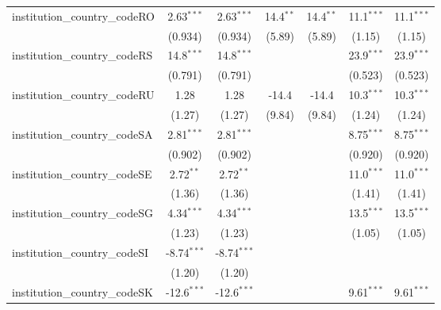 \begin{tabular}{lcccccc}
   institution\_country\_codeRO          & 2.63$^{***}$   & 2.63$^{***}$   & 14.4$^{**}$   & 14.4$^{**}$   & 11.1$^{***}$  & 11.1$^{***}$\\   
                                         & (0.934)        & (0.934)        & (5.89)        & (5.89)        & (1.15)        & (1.15)\\   
   institution\_country\_codeRS          & 14.8$^{***}$   & 14.8$^{***}$   &               &               & 23.9$^{***}$  & 23.9$^{***}$\\   
                                         & (0.791)        & (0.791)        &               &               & (0.523)       & (0.523)\\   
   institution\_country\_codeRU          & 1.28           & 1.28           & -14.4         & -14.4         & 10.3$^{***}$  & 10.3$^{***}$\\   
                                         & (1.27)         & (1.27)         & (9.84)        & (9.84)        & (1.24)        & (1.24)\\   
   institution\_country\_codeSA          & 2.81$^{***}$   & 2.81$^{***}$   &               &               & 8.75$^{***}$  & 8.75$^{***}$\\   
                                         & (0.902)        & (0.902)        &               &               & (0.920)       & (0.920)\\   
   institution\_country\_codeSE          & 2.72$^{**}$    & 2.72$^{**}$    &               &               & 11.0$^{***}$  & 11.0$^{***}$\\   
                                         & (1.36)         & (1.36)         &               &               & (1.41)        & (1.41)\\   
   institution\_country\_codeSG          & 4.34$^{***}$   & 4.34$^{***}$   &               &               & 13.5$^{***}$  & 13.5$^{***}$\\   
                                         & (1.23)         & (1.23)         &               &               & (1.05)        & (1.05)\\   
   institution\_country\_codeSI          & -8.74$^{***}$  & -8.74$^{***}$  &               &               &               &   \\   
                                         & (1.20)         & (1.20)         &               &               &               &   \\   
   institution\_country\_codeSK          & -12.6$^{***}$  & -12.6$^{***}$  &               &               & 9.61$^{***}$  & 9.61$^{***}$\\   

\end{tabular}
